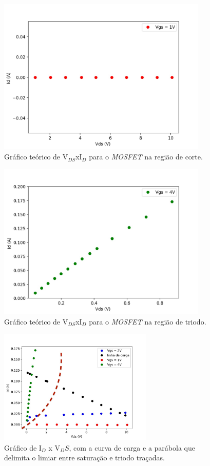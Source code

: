 \documentclass{article}
\begin{document}
\begin{figure}[h!]
    \centering
    \includegraphics[height=7.5cm]{imgSource/vgs1_teo.jpg}
    \caption{Gráfico teórico de V$_{DS}$xI$_{D}$ para o \emph{MOSFET} na região de corte.}
    \label{fig:mos_cor_teo}
\end{figure}

\begin{figure}[h!]
    \centering
    \includegraphics[height=7.5cm]{imgSource/vgs4_teo.jpg}
    \caption{Gráfico teórico de V$_{DS}$xI$_{D}$ para o \emph{MOSFET} na região de triodo.}
    \label{fig:mos_tri_teo}
\end{figure}

\begin{figure}[h!]
    \centering
    \includegraphics[height=5.5cm]{imgSource/carga.jpg}
    \caption{Gráfico de I$_D$ x V$_DS$, com a curva de carga e a parábola que delimita o limiar entre saturação e triodo traçadas.}
    \label{fig:carga}
\end{figure}
\end{document}
